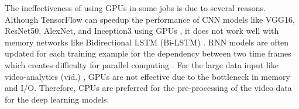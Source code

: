 The ineffectiveness of using GPUs in some jobs is due to several reasons.
Although TensorFlow can speedup the performance of CNN models like VGG16, ResNet50, AlexNet, and Inception3 using GPUs \cite{tensorflow-benchmark}, it does not work well with memory networks like Bidirectional LSTM (Bi-LSTM) \cite{deep-learning-cpu-gpu-benchmark}.
RNN models are often updated for each training example for the dependency between two time frames which creates difficulty for parallel computing \cite{huang2013accelerating}.
For the large data input like video-analytics (vid.) \cite{keras-video-classifier}, GPUs are not effective due to the bottleneck in memory and I/O. Therefore, CPUs are preferred for the pre-processing of the video data for the deep learning models.






%

